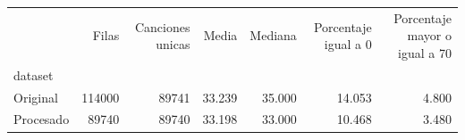 \begin{tabular}{lrrrrrr}
\toprule
 & Filas & Canciones unicas & Media & Mediana & Porcentaje igual a 0 & Porcentaje mayor o igual a 70 \\
dataset &  &  &  &  &  &  \\
\midrule
Original & 114000 & 89741 & 33.239 & 35.000 & 14.053 & 4.800 \\
Procesado & 89740 & 89740 & 33.198 & 33.000 & 10.468 & 3.480 \\
\bottomrule
\end{tabular}
